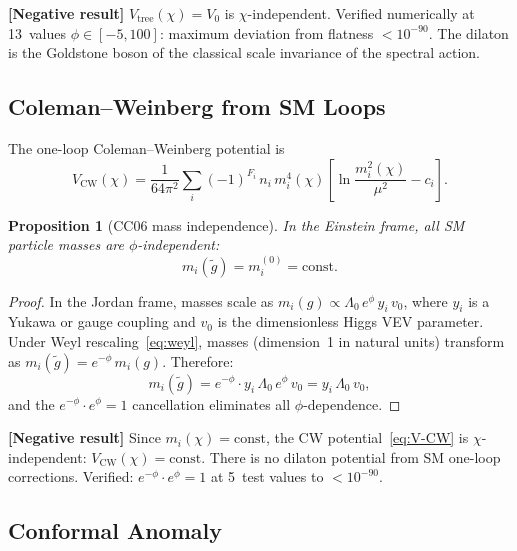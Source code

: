 \documentclass[11pt,a4paper]{article}
\theoremstyle{plain}
\newtheorem{proposition}[theorem]{Proposition}
\theoremstyle{definition}
\newcommand{\negresult}[1]{%
  \par\smallskip\noindent
  \colorbox{red!10}{\parbox{\dimexpr\linewidth-2\fboxsep}{%
    \textcolor{red!60!black}{\textbf{[Negative result]}} #1}}%
  \par\smallskip}
\begin{document}
\negresult{$V_{\mathrm{tree}}(\chi) = V_0$ is
$\chi$-independent.  Verified numerically at 13~values
$\phi \in [-5, 100]$: maximum deviation from flatness $< 10^{-90}$.
The dilaton is the Goldstone boson of the classical scale invariance
of the spectral action.}

\subsection{Coleman--Weinberg from SM Loops}

The one-loop Coleman--Weinberg potential is
\begin{equation}\label{eq:V-CW}
  V_{\mathrm{CW}}(\chi) = \frac{1}{64\pi^2}
  \sum_i (-1)^{F_i}\,n_i\,m_i^4(\chi)
  \left[\ln\frac{m_i^2(\chi)}{\mu^2} - c_i\right].
\end{equation}

\begin{proposition}[CC06 mass independence]\label{prop:mass-indep}
In the Einstein frame, all SM particle masses are
$\phi$-independent:
\begin{equation}
  m_i(\tilde{g}) = m_i^{(0)} = \mathrm{const}.
\end{equation}
\end{proposition}

\begin{proof}
In the Jordan frame, masses scale as
$m_i(g) \propto \Lambda_0\,e^\phi\,y_i\,v_0$, where $y_i$ is a
Yukawa or gauge coupling and $v_0$ is the dimensionless Higgs VEV
parameter.  Under Weyl rescaling~\eqref{eq:weyl}, masses (dimension~1
in natural units) transform as
$m_i(\tilde{g}) = e^{-\phi}\,m_i(g)$.  Therefore:
\begin{equation}
  m_i(\tilde{g}) = e^{-\phi}\cdot y_i\,\Lambda_0\,e^\phi\,v_0
  = y_i\,\Lambda_0\,v_0,
\end{equation}
and the $e^{-\phi}\cdot e^\phi = 1$ cancellation eliminates all
$\phi$-dependence.
\end{proof}

\negresult{Since $m_i(\chi) = \mathrm{const}$, the CW
potential~\eqref{eq:V-CW} is $\chi$-independent:
$V_{\mathrm{CW}}(\chi) = \mathrm{const}$.
There is no dilaton potential from SM one-loop corrections.
Verified: $e^{-\phi}\cdot e^\phi = 1$ at 5~test values to
$< 10^{-90}$.}

\subsection{Conformal Anomaly}
\end{document}

